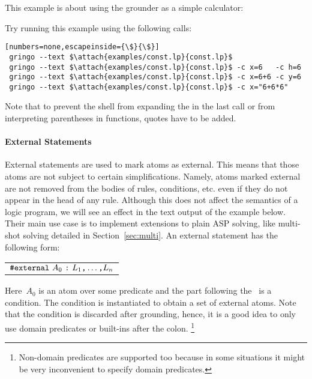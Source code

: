 \begin{example}
This example is about using the grounder as a simple calculator:
%

%
Try running this example using the following calls:
\begin{lstlisting}[numbers=none,escapeinside={\$}{\$}]
 gringo --text $\attach{examples/const.lp}{const.lp}$
 gringo --text $\attach{examples/const.lp}{const.lp}$ -c x=6   -c h=6
 gringo --text $\attach{examples/const.lp}{const.lp}$ -c x=6+6 -c y=6
 gringo --text $\attach{examples/const.lp}{const.lp}$ -c x="6+6*6"
\end{lstlisting}
Note that to prevent the shell from expanding the \code{*} in the last call
or from interpreting parentheses in functions,
quotes have to be added.
\eexample
\end{example}

\paragraph{External Statements}
%
External statements are used to mark atoms as external.
This means that those atoms are not subject to certain simplifications.
Namely,
atoms marked external are not removed from the bodies of rules, conditions, etc.
even if they do not appear in the head of any rule.
Although this does not affect the semantics of a logic program,
we will see an effect in the text output of the example below.
Their main use case is to implement extensions to plain ASP solving,
like multi-shot solving detailed in Section~\ref{sec:multi}.
An external statement has the following form:
%
\par
\medskip
\begin{tabular}{l}
$\texttt{\#external}~A_0~\texttt{:}~L_1\text{\texttt{,}}\dots\text{\texttt{,}}L_n$\code{.}
\end{tabular}
\par
\medskip
\noindent
%
Here~$A_0$ is an atom over some predicate and
the part following the~\code{:} is a condition.
The condition is instantiated to obtain a set of external atoms.
Note that the condition is discarded after grounding,
hence, it is a good idea to only use domain predicates or built-ins after the colon.%
\footnote{Non-domain predicates are supported too
because in some situations it might be very inconvenient to specify domain predicates.}

